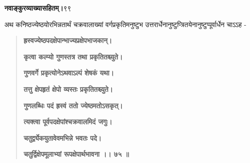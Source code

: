 \documentclass[11pt, openany]{book}
\begin{document}
\hspace{2in}\textbf{नवाङ्कुरव्याख्यासहितम्।}\hspace{2in}९९

\vspace{5mm}

\begin{sloppypar}
\hangindent=0.2in \hspace{0.2in}अथ कनिष्ठज्येष्ठयोरभिन्नतार्थं चक्रवालाख्यां वर्गप्रकृतिमनुष्टुभ उत्तरार्धेनानुष्टुप्त्रितयेनानुष्टुप्पूर्वार्धेन चाऽऽह -

\begin{quote}
\hspace{1in}\textbf{ह्रस्वज्येष्ठपदक्षेपान्भाज्यप्रक्षेपभाजकान्।}

\hspace{1in}\textbf{कृत्वा कल्प्यो गुणस्तत्र तथा प्रकृतितश्च्युते।}

\hspace{1in}\textbf{गुणवर्गे प्रकृत्योनेऽथवाऽल्पं शेषकं यथा।}

\hspace{1in}\textbf{तत्तु क्षेपहृतं क्षेपो व्यस्तः प्रकृतितश्च्युते।}

\hspace{1in}\textbf{गुणलब्धिः पदं ह्रस्वं ततो ज्येष्ठमतोऽसकृत्।}

\hspace{1in}\textbf{त्यक्त्वा पूर्वपदक्षेपांश्चक्रवालमिदं जगुः।}

\hspace{1in}\textbf{चतुर्द्व्येकयुतावेवमभिन्ने भवतः पदे।}

\hspace{1in}\textbf{चतुर्द्विक्षेपमूलाभ्यां रूपक्षेपार्थभावना ।। ७५ ॥}
\end{quote}


\end{sloppypar}
\end{document}
